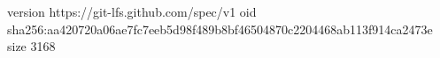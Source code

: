 version https://git-lfs.github.com/spec/v1
oid sha256:aa420720a06ae7fc7eeb5d98f489b8bf46504870c2204468ab113f914ca2473e
size 3168

